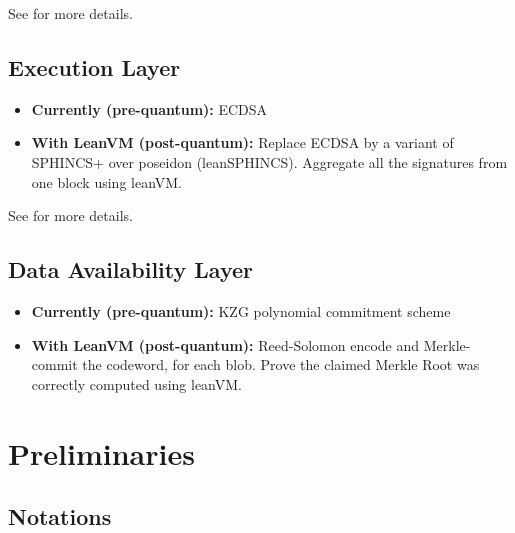 \documentclass{article}
\theoremstyle{definition}
\begin{document}
See  for more details.

\subsection{Execution Layer}
\begin{itemize}
    \item \textbf{Currently (pre-quantum):} ECDSA \cite{ecdsa}
    \item \textbf{With LeanVM (post-quantum):} Replace ECDSA by a variant of SPHINCS+ \cite{sphincs_plus} over poseidon (leanSPHINCS). Aggregate all the signatures from one block using leanVM.
\end{itemize}

See  for more details.

\subsection{Data Availability Layer}

\begin{itemize}
    \item \textbf{Currently (pre-quantum):} KZG polynomial commitment scheme \cite{kzg}
    \item \textbf{With LeanVM (post-quantum):} Reed-Solomon encode and Merkle-commit the codeword, for each blob. Prove the claimed Merkle Root was correctly computed using leanVM.
\end{itemize}

\section{Preliminaries}

\subsection{Notations}
\end{document}

